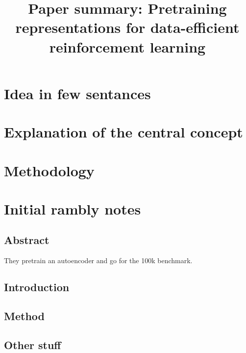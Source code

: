 \documentclass{article}
\title{Paper summary: Pretraining representations for data-efficient reinforcement learning}
\begin{document}
\maketitle


\section{Idea in few sentances}



\section{Explanation of the central concept}


\section{Methodology}


\section{Initial rambly notes}


\subsection{Abstract}
They pretrain an autoencoder and go for the 100k benchmark.

\subsection{Introduction}

\subsection{Method}



\subsection{Other stuff}
\end{document}
